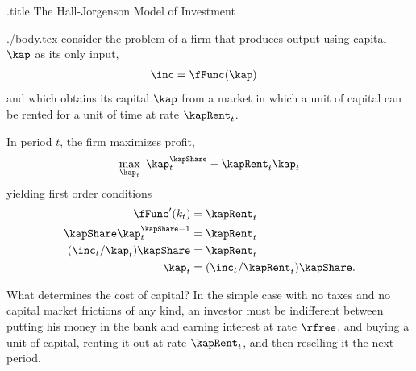 \documentclass{handout}
\begin{document}
\handoutHeader

\begin{verbatimwrite}{\jobname.title}
The Hall-Jorgenson Model of Investment
\end{verbatimwrite}

\handoutNameMake
\begin{verbatimwrite}{./body.tex}
\cite{hall&jorgenson:i} consider the problem of a firm that produces output 
using capital $\kap$ as its only input,
\begin{equation}\begin{gathered}\begin{aligned}
       \inc  & =  \fFunc(\kap)
\end{aligned}\end{gathered}\end{equation}
and which obtains its capital $\kap$ from a market in which a unit
of capital can be rented for a unit of time at rate 
 $\kapRent_{t}$.   

In period $t$, the firm maximizes profit,
\begin{displaymath}
        \max_{\kap_{t}} ~ \kap_{t}^{\kapShare}-\kapRent_{t}\kap_{t}
\end{displaymath}
yielding first order conditions
\begin{equation}\begin{gathered}\begin{aligned}
\fFunc^{\prime}(k_{t}) & =  \kapRent_{t}
\\        \kapShare \kap_{t}^{\kapShare-1} & =  \kapRent_{t}  \\
         (\inc_{t}/\kap_{t}) \kapShare & =  \kapRent_{t}  \\
        \kap_{t} & =  (\inc_{t}/\kapRent_{t})\kapShare . \label{eq:khj}
\end{aligned}\end{gathered}\end{equation}

What determines the cost of capital?  In the simple case with no taxes and no 
capital market frictions of any kind, an investor must be indifferent 
between putting his money in the bank and earning interest at rate 
$\rfree$, and buying a unit of capital, renting it out at rate $\kapRent_{t}$, and 
then reselling it the next period.


\end{verbatimwrite}
\end{document}
